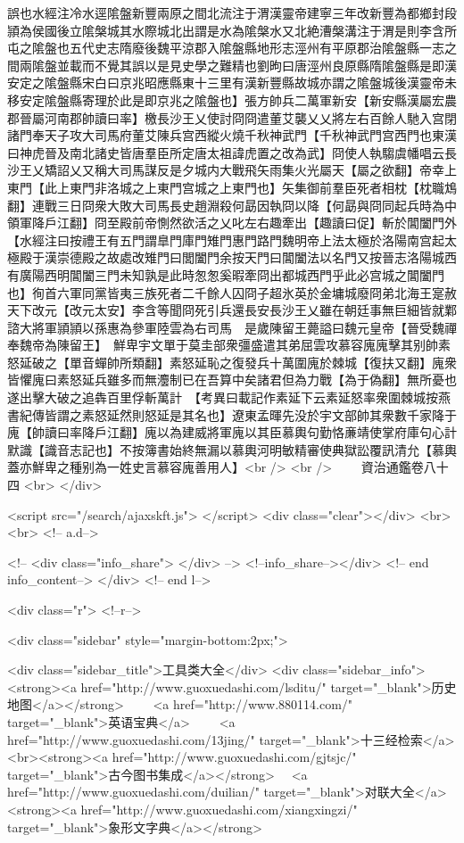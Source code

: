 誤也水經注冷水逕隂盤新豐兩原之間北流注于渭漢靈帝建寧三年改新豐為都鄉封段頴為侯國後立隂槃城其水際城北出謂是水為隂槃水又北絶漕槃溝注于渭是則李含所屯之隂盤也五代史志隋廢後魏平涼郡入隂盤縣地形志涇州有平原郡治隂盤縣一志之間兩隂盤並載而不覺其誤以是見史學之難精也劉昫曰唐涇州良原縣隋隂盤縣是即漢安定之隂盤縣宋白曰京兆昭應縣東十三里有漢新豐縣故城亦謂之隂盤城後漢靈帝未移安定隂盤縣寄理於此是即京兆之隂盤也】張方帥兵二萬軍新安【新安縣漢屬宏農郡晉屬河南郡帥讀曰率】檄長沙王乂使討冏冏遣董艾襲乂乂將左右百餘人馳入宫閉諸門奉天子攻大司馬府董艾陳兵宫西縱火燒千秋神武門【千秋神武門宫西門也東漢曰神虎晉及南北諸史皆唐羣臣所定唐太祖諱虎置之改為武】冏使人執騶虞幡唱云長沙王乂矯詔乂又稱大司馬謀反是夕城内大戰飛矢雨集火光屬天【屬之欲翻】帝幸上東門【此上東門非洛城之上東門宫城之上東門也】矢集御前羣臣死者相枕【枕職鴆翻】連戰三日冏衆大敗大司馬長史趙淵殺何勗因執冏以降【何勗與冏同起兵時為中領軍降戶江翻】冏至殿前帝惻然欲活之乂叱左右趣牽出【趣讀曰促】斬於閶闔門外【水經注曰按禮王有五門謂臯門庫門雉門惠門路門魏明帝上法太極於洛陽南宫起太極殿于漢崇德殿之故處改雉門曰閭闔門余按天門曰閶闔法以名門又按晉志洛陽城西有廣陽西明閶闔三門未知孰是此時怱怱奚暇牽冏出都城西門乎此必宫城之閶闔門也】徇首六軍同黨皆夷三族死者二千餘人囚冏子超氷英於金墉城廢冏弟北海王寔赦天下改元【改元太安】李含等聞冏死引兵還長安長沙王乂雖在朝廷事無巨細皆就鄴諮大將軍頴頴以孫惠為參軍陸雲為右司馬　是歲陳留王薨謚曰魏元皇帝【晉受魏禪奉魏帝為陳留王】　鮮卑宇文單于莫圭部衆彊盛遣其弟屈雲攻慕容廆廆擊其别帥素怒延破之【單音蟬帥所類翻】素怒延恥之復發兵十萬圍廆於棘城【復扶又翻】廆衆皆懼廆曰素怒延兵雖多而無灋制已在吾算中矣諸君但為力戰【為于偽翻】無所憂也遂出擊大破之追犇百里俘斬萬計　【考異曰載記作素延下云素延怒率衆圍棘城按燕書紀傳皆謂之素怒延然則怒延是其名也】遼東孟暉先没於宇文部帥其衆數千家降于廆【帥讀曰率降戶江翻】廆以為建威將軍廆以其臣慕輿句勤恪亷靖使掌府庫句心計默識【識音志記也】不按簿書始終無漏以慕輿河明敏精審使典獄訟覆訊清允【慕輿蓋亦鮮卑之種别為一姓史言慕容廆善用人】<br />
<br />
　　資治通鑑卷八十四  <br>
   </div> 

<script src="/search/ajaxskft.js"> </script>
 <div class="clear"></div>
<br>
<br>
 <!-- a.d-->

 <!--
<div class="info_share">
</div> 
-->
 <!--info_share--></div>   <!-- end info_content-->
  </div> <!-- end l-->

<div class="r">   <!--r-->



<div class="sidebar"  style="margin-bottom:2px;">

 
<div class="sidebar_title">工具类大全</div>
<div class="sidebar_info">
<strong><a href="http://www.guoxuedashi.com/lsditu/" target="_blank">历史地图</a></strong>　　
<a href="http://www.880114.com/" target="_blank">英语宝典</a>　　
<a href="http://www.guoxuedashi.com/13jing/" target="_blank">十三经检索</a>　
<br><strong><a href="http://www.guoxuedashi.com/gjtsjc/" target="_blank">古今图书集成</a></strong>　
<a href="http://www.guoxuedashi.com/duilian/" target="_blank">对联大全</a>　<strong><a href="http://www.guoxuedashi.com/xiangxingzi/" target="_blank">象形文字典</a></strong>　

